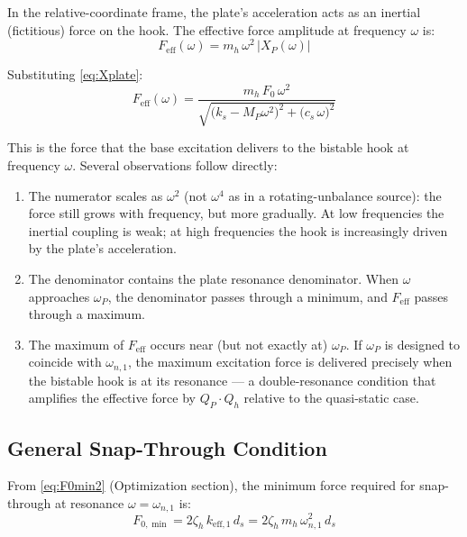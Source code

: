 \documentclass[11pt,letterpaper]{article}
\begin{document}
In the relative-coordinate frame, the plate's acceleration acts as an inertial
(fictitious) force on the hook. The effective force amplitude at frequency
$\omega$ is:
\begin{equation}
  F_{\mathrm{eff}}(\omega)
  = m_h\,\omega^2\,\bigl|X_P(\omega)\bigr|
  \label{eq:Feff_def}
\end{equation}

Substituting \cref{eq:Xplate}:
\begin{equation}
  \boxed{
  F_{\mathrm{eff}}(\omega)
  = \frac{m_h\,F_0\,\omega^2}{\sqrt{\bigl(k_s - M_P\omega^2\bigr)^2
    + \bigl(c_s\,\omega\bigr)^2}}
  }
  \label{eq:Feff}
\end{equation}

This is the force that the base excitation delivers to the bistable hook at
frequency $\omega$. Several observations follow directly:

\begin{enumerate}
  \item The numerator scales as $\omega^2$ (not $\omega^4$ as in a
    rotating-unbalance source): the force still grows with frequency, but more
    gradually.  At low frequencies the inertial coupling is weak; at high
    frequencies the hook is increasingly driven by the plate's acceleration.
  \item The denominator contains the plate resonance denominator. When $\omega$
    approaches $\omega_P$, the denominator passes through a minimum, and
    $F_{\mathrm{eff}}$ passes through a maximum.
  \item The maximum of $F_{\mathrm{eff}}$ occurs near (but not exactly at)
    $\omega_P$. If $\omega_P$ is designed to coincide with $\omega_{n,1}$, the
    maximum excitation force is delivered precisely when the bistable hook is at
    its resonance --- a double-resonance condition that amplifies the effective
    force by $Q_P \cdot Q_h$ relative to the quasi-static case.
\end{enumerate}

\subsection{General Snap-Through Condition}
\label{ssec:snapcond_general}

From \cref{eq:F0min2} (Optimization section), the minimum force required for
snap-through at resonance $\omega = \omega_{n,1}$ is:
\begin{equation}
  F_{0,\min} = 2\zeta_h\,k_{\mathrm{eff},1}\,d_s
             = 2\zeta_h\,m_h\,\omega_{n,1}^2\,d_s
  \label{eq:F0min_recall}
\end{equation}
\end{document}
